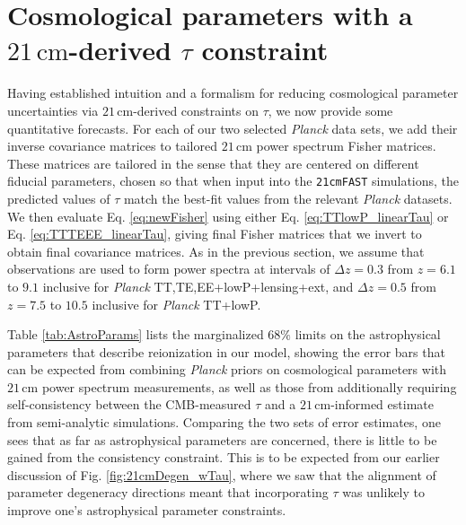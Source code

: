\documentclass[twocolumn,aps,prd,nofootinbib,showpacs,superscriptaddress]{revtex4-1}
\begin{document}
\section{Cosmological parameters with a $21\,\textrm{cm}$-derived $\tau$ constraint}
\label{sec:CMBresults}

Having established intuition and a formalism for reducing cosmological parameter uncertainties via $21\,\textrm{cm}$-derived constraints on $\tau$, we now provide some quantitative forecasts. For each of our two selected \emph{Planck} data sets, we add their inverse covariance matrices to tailored $21\,\textrm{cm}$ power spectrum Fisher matrices. These matrices are tailored in the sense that they are centered on different fiducial parameters, chosen so that when input into the {\tt 21cmFAST} simulations, the predicted values of $\tau$ match the best-fit values from the relevant \emph{Planck} datasets. We then evaluate Eq. \eqref{eq:newFisher} using either Eq. \eqref{eq:TTlowP_linearTau} or Eq. \eqref{eq:TTTEEE_linearTau}, giving final Fisher matrices that we invert to obtain final covariance matrices. As in the previous section, we assume that observations are used to form power spectra at intervals of $\Delta z = 0.3$ from $z = 6.1$ to $9.1$ inclusive for \emph{Planck} TT,TE,EE+lowP+lensing+ext, and $\Delta z = 0.5$ from $z=7.5$ to $10.5$ inclusive for \emph{Planck} TT+lowP.

Table \ref{tab:AstroParams} lists the marginalized $68\%$ limits on the astrophysical parameters that describe reionization in our model, showing the error bars that can be expected from combining \emph{Planck} priors on cosmological parameters with $21\,\textrm{cm}$ power spectrum measurements, as well as those from additionally requiring self-consistency between the CMB-measured $\tau$ and a $21\,\textrm{cm}$-informed estimate from semi-analytic simulations. Comparing the two sets of error estimates, one sees that as far as astrophysical parameters are concerned, there is little to be gained from the consistency constraint. This is to be expected from our earlier discussion of Fig. \ref{fig:21cmDegen_wTau}, where we saw that the alignment of parameter degeneracy directions meant that incorporating $\tau$ was unlikely to improve one's astrophysical parameter constraints.
\end{document}
